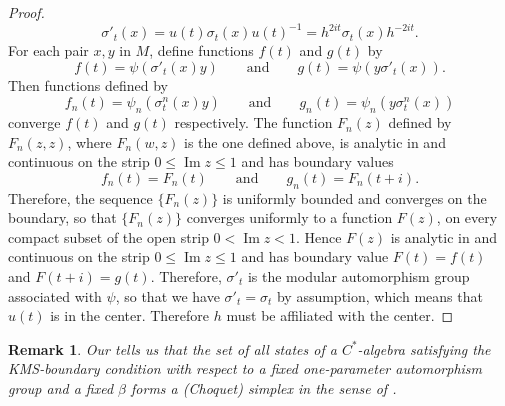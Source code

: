 \documentclass[12pt,b5paper,twoside]{article}
\theoremstyle{takesaki}
\newtheorem*{remark}{Remark}
\numberwithin{equation}{section}
\begin{document}
\begin{proof}
\[
  \sigma'_t(x)=u(t)\sigma_t(x)u(t)^{-1}
  =h^{2it}\sigma_t(x)h^{-2it}.
\]
For each pair $x,y$ in $M$, define functions $f(t)$ and $g(t)$ by
\[
  f(t)=\psi(\sigma'_t(x)y)
  \qquad\text{and}\qquad
  g(t)=\psi(y\sigma'_t(x)).
\]
Then functions defined by
\[
  f_n(t)=\psi_n(\sigma_t^n(x)y)
  \qquad\text{and}\qquad
  g_n(t)=\psi_n(y\sigma_t^n(x))
\]
converge $f(t)$ and $g(t)$ respectively.  The function $F_n(z)$ defined
by $F_n(z,z)$, where $F_n(w,z)$ is the one defined above, is analytic in
and continuous on the strip $0\leq\operatorname{Im}z\leq1$ and has
boundary values
\[
  f_n(t)=F_n(t)
  \qquad\text{and}\qquad
  g_n(t)=F_n(t+i).
\]
Therefore, the sequence $\{F_n(z)\}$ is uniformly bounded and converges
on the boundary, so that $\{F_n(z)\}$ converges uniformly to a function
$F(z)$, on every compact subset of the open strip
$0<\operatorname{Im}z<1$.  Hence $F(z)$ is analytic in and continuous on
the strip $0\leq\operatorname{Im}z\leq1$ and has boundary value
$F(t)=f(t)$ and $F(t+i)=g(t)$.  Therefore, $\sigma'_t$ is the modular
automorphism group associated with $\psi$, so that we have
$\sigma'_t=\sigma_t$ by assumption, which means that $u(t)$ is in the
center.  Therefore $h$ must be affiliated with the center.
\end{proof}

\begin{remark}
Our  tells us that the set of all states of a
$C^*$-algebra satisfying the KMS-boundary condition with respect to a
fixed one-parameter automorphism group and a fixed $\beta$ forms a
(Choquet) simplex in the sense of \cite{ref25}.
\end{remark}
\end{document}

